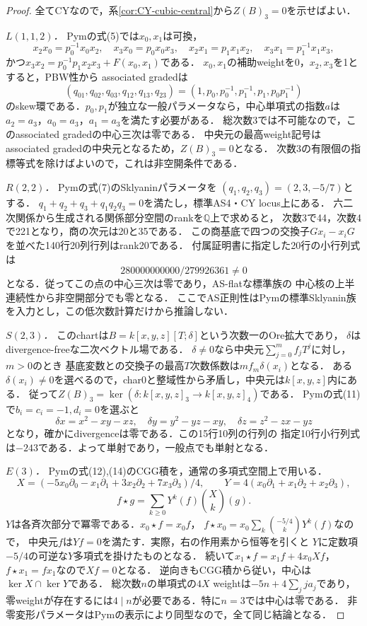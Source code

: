 \begin{proof}
全てCYなので，系\ref{cor:CY-cubic-central}から$Z(B)_3=0$を示せばよい．

\emph{$L(1,1,2)$．}
Pymの式(5)では$x_0,x_1$は可換，
\[
 x_2x_0=p_0^{-1}x_0x_2,\quad x_3x_0=p_0x_0x_3,\quad
 x_2x_1=p_1x_1x_2,\quad x_3x_1=p_1^{-1}x_1x_3,
\]
かつ$x_3x_2=p_0^{-1}p_1x_2x_3+F(x_0,x_1)$である．
$x_0,x_1$の補助weightを0，$x_2,x_3$を1とすると，PBW性から
associated gradedは
\[
 (q_{01},q_{02},q_{03},q_{12},q_{13},q_{23})
 =(1,p_0,p_0^{-1},p_1^{-1},p_1,p_0p_1^{-1})
\]
のskew環である．$p_0,p_1$が独立な一般パラメータなら，中心単項式の指数$a$は
$a_2=a_3$，$a_0=a_3$，$a_1=a_3$を満たす必要がある．
総次数3では不可能なので，このassociated gradedの中心三次は零である．
中央元の最高weight記号はassociated gradedの中央元となるため，$Z(B)_3=0$となる．
次数3の有限個の指標等式を除けばよいので，これは非空開条件である．

\emph{$R(2,2)$．}
Pymの式(7)のSklyaninパラメータを
$(q_1,q_2,q_3)=(2,3,-5/7)$とする．
$q_1+q_2+q_3+q_1q_2q_3=0$を満たし，標準AS4・CY locus上にある．
六二次関係から生成される関係部分空間のrankを$\mathbb Q$上で求めると，
次数3で44，次数4で221となり，商の次元は20と35である．
この商基底で四つの交換子$Gx_i-x_iG$を並べた140行20列行列はrank20である．
付属証明書に指定した20行の小行列式は
\[
 280000000000/279926361\ne0
\]
となる．従ってこの点の中心三次は零であり，AS-flatな標準族の
中心核の上半連続性から非空開部分でも零となる．
ここでAS正則性はPymの標準Sklyanin族を入力とし，この低次数計算だけから推論しない．

\emph{$S(2,3)$．}
このchartは$B=k[x,y,z][T;\delta]$という次数一のOre拡大であり，
$\delta$はdivergence-freeな二次ベクトル場である．
$\delta\ne0$なら中央元$\sum_{j=0}^m f_jT^j$に対し，$m>0$のとき
基底変数との交換子の最高$T$次数係数は$m f_m\delta(x_i)$となる．
ある$\delta(x_i)\ne0$を選べるので，char0と整域性から矛盾し，中央元は$k[x,y,z]$内にある．
従って$Z(B)_3=\ker(\delta:k[x,y,z]_3\to k[x,y,z]_4)$である．
Pymの式(11)で$b_i=c_i=-1,d_i=0$を選ぶと
\[
 \delta x=x^2-xy-xz,\quad
 \delta y=y^2-yz-xy,\quad
 \delta z=z^2-zx-yz
\]
となり，確かにdivergenceは零である．この15行10列の行列の
指定10行小行列式は$-243$である．よって単射であり，一般点でも単射となる．

\emph{$E(3)$．}
Pymの式(12),(14)のCGG積を，通常の多項式空間上で用いる．
\[
 X=(-5x_0\partial_0-x_1\partial_1+3x_2\partial_2+7x_3\partial_3)/4,
 \qquad Y=4(x_0\partial_1+x_1\partial_2+x_2\partial_3),
\]
\[
 f\star g=\sum_{k\ge0}Y^k(f)\binom Xk(g).
\]
$Y$は各斉次部分で冪零である．$x_0\star f=x_0f$，
$f\star x_0=x_0\sum_k\binom{-5/4}{k}Y^k(f)$なので，
中央元$f$は$Yf=0$を満たす．実際，右の作用素から恒等を引くと
$Y$に定数項$-5/4$の可逆な$Y$多項式を掛けたものとなる．
続いて$x_1\star f=x_1f+4x_0Xf$，$f\star x_1=fx_1$なので$Xf=0$となる．
逆向きもCGG積から従い，中心は$\ker X\cap\ker Y$である．
総次数$n$の単項式の$4X$ weightは$-5n+4\sum_j j a_j$であり，
零weightが存在するには$4\mid n$が必要である．特に$n=3$では中心は零である．
非零変形パラメータはPymの表示により同型なので，全て同じ結論となる．
\end{proof}

